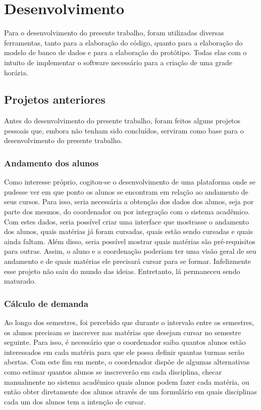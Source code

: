 \chapter{Desenvolvimento} %


Para o desenvolvimento do presente trabalho, foram utilizadas diversas ferramentas, tanto para a elaboração do código, quanto para a elaboração do modelo de banco de dados e para a elaboração do protótipo. Todas elas com o intuito de implementar o software necessário para a criação de uma grade horária.

\section{Projetos anteriores} %

Antes do desenvolvimento do presente trabalho, foram feitos alguns projetos pessoais que, embora não tenham sido concluídos, serviram como base para o desenvolvimento do presente trabalho.

\subsection{Andamento dos alunos} %

Como interesse próprio, cogitou-se o desenvolvimento de uma plataforma onde se pudesse ver em que ponto os alunos se encontram em relação ao andamento de seus cursos. Para isso, seria necessária a obtenção dos dados dos alunos, seja por parte dos mesmos, do coordenador ou por integração com o sistema acadêmico. Com estes dados, seria possível criar uma interface que mostrasse o andamento dos alunos, quais matérias já foram cursadas, quais estão sendo cursadas e quais ainda faltam. Além disso, seria possível mostrar quais matérias são pré-requisitos para outras. Assim, o aluno e a coordenação poderiam ter uma visão geral de seu andamento e de quais matérias ele precisará cursar para se formar. Infelizmente esse projeto não saiu do mundo das ideias. Entretanto, lá permaneceu sendo maturado.

\subsection{Cálculo de demanda} %

Ao longo dos semestres, foi percebido que durante o intervalo entre os semestres, os alunos precisam se inscrever nas matérias que desejam cursar no semestre seguinte. Para isso, é necessário que o coordenador saiba quantos alunos estão interessados em cada matéria para que ele possa definir quantas turmas serão abertas. Com este fim em mente, o coordenador dispõe de algumas alternativas como estimar quantos alunos se inscreverão em cada disciplina, checar manualmente no sistema acadêmico quais alunos podem fazer cada matéria, ou então obter diretamente dos alunos através de um formulário em quais disciplinas cada um dos alunos tem a intenção de cursar.

